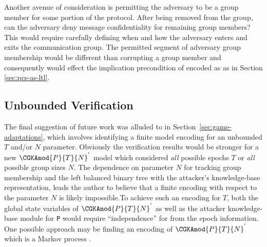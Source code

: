 Another avenue of consideration is permitting the adversary to be a group member for some portion of the \CGKAdef protocol.
After being removed from the group, can the adversary deny message confidentiality for remaining group members?
This would require carefully defining when and how the adversary enters and exits the communication group.
The permitted segment of adversary group membership would be different than corrupting a group member and consequently would effect the implication precondition of  encoded as  as in Section \ref{sec:pcs-as-ltl}.


\hypertarget{sec:unbounded-verification}{%
\subsection{Unbounded Verification}\label{sec:unbounded-verification}}

The final suggestion of future work was alluded to in Section\ \ref{sec:game-adaptations}, which involves identifying a finite model encoding for an unbounded \(T\) and/or \(N\) parameter.
Obviously the verification results would be stronger for a new \( \CGKAmod{P}{T}{N}^{'} \) model which considered \emph{all} possible epochs \(T\) or \emph{all} possible group sizes \(N\).
The dependence on parameter \(N\) for tracking group membership and the left balanced binary tree with the attacker's knowledge-base representation, leads the author to believe that a finite encoding with respect to the parameter \(N\) is likely impossible.To achieve such an encoding for \(T\), both the global state variables of \( \CGKAmod{P}{T}{N}^{'} \) as well as the attacker knowledge-base module for \texttt{P} would require ``independence'' for from the epoch information.
One possible approach may be finding an encoding of \( \CGKAmod{P}{T}{N}^{'} \) which is a Markov process \autocite{markov1906a}.

